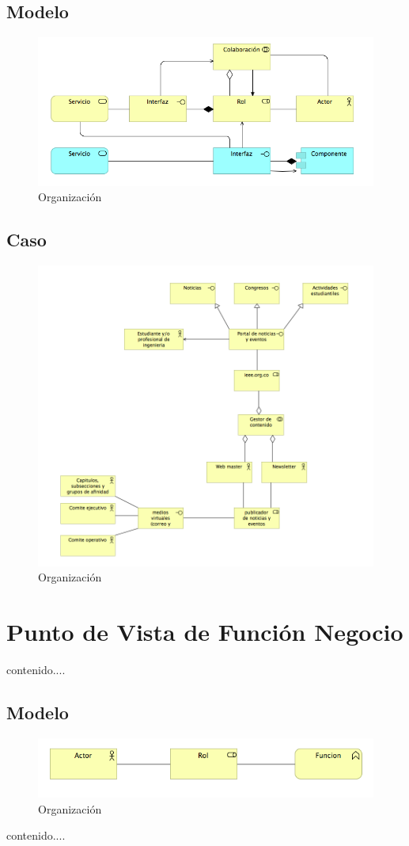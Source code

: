 \subsection{Modelo}
\begin{figure}[th!]
	\centering
	\includegraphics[width=0.8\linewidth]{arquitectura_diseno/imgs/M_Coperacion}
	\caption{Organización}
\end{figure}
\newpage
\subsection{Caso}
\begin{figure}[th!]
	\centering
	\includegraphics[width=0.8\linewidth]{arquitectura_diseno/imgs/C_Coperacion}
	\caption{Organización}
\end{figure}
\newpage
\section{Punto de Vista de Función Negocio}
contenido....
\subsection{Modelo}
\begin{figure}[th!]
	\centering
	\includegraphics[width=0.8\linewidth]{arquitectura_diseno/imgs/M_FuncionNegocio}
	\caption{Organización}
\end{figure}
\newpage
contenido....
